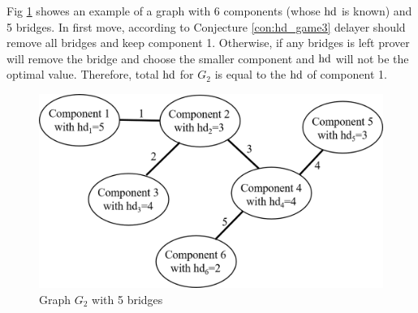 \documentclass[]{book}
\begin{document}
\begin{examp}\label{exp:hd5}
       Fig \ref{fig:hd5} showes an example of a graph with 6 components (whose $\operatorname{hd}$ is known) and 5 bridges. In first move,
	   according to Conjecture \ref{con:hd_game3} delayer should remove all bridges and keep component 1. Otherwise, if any bridges is 
	   left prover will remove the bridge and choose the smaller component and $\operatorname{hd}$ will not be the optimal value.
	   Therefore, total $\operatorname{hd}$ for $G_2$ is equal to the $\operatorname{hd}$ of component 1.	   

	  \begin{figure}
      \begin{center}
      \includegraphics[scale =0.65]{graph_with_bridges.png}
      \caption{Graph $G_2$ with 5 bridges}
	  \label{fig:hd5}
      \end{center}
      \end{figure}
\end{examp}
\end{document}
